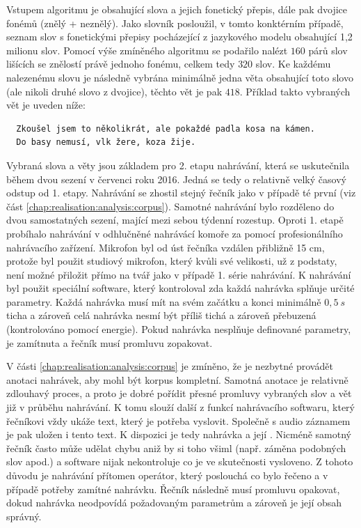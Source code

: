Vstupem algoritmu je  obsahující slova a jejich fonetický přepis, dále pak dvojice fonémů (znělý + neznělý). Jako slovník posloužil, v tomto konktérním případě, seznam slov s fonetickými přepisy pocházející z jazykového modelu obsahující 1,2 milionu slov. Pomocí výše zmíněného algoritmu se podařilo nalézt $160$ párů slov lišících se znělostí právě jednoho fonému, celkem tedy $320$ slov. Ke každému nalezenému slovu je následně vybrána minimálně jedna věta obsahující toto slovo (ale nikoli druhé slovo z dvojice), těchto vět je pak $418$. Příklad takto vybraných vět je uveden níže:

\begin{verbatim}
  Zkoušel jsem to několikrát, ale pokaždé padla kosa na kámen.
  Do basy nemusí, vlk žere, koza žije.
\end{verbatim}

Vybraná slova a věty jsou základem pro 2. etapu nahrávání, která se uskutečnila během dvou sezení v červenci roku 2016. Jedná se tedy o relativně velký časový odstup od 1. etapy. Nahrávání se zhostil stejný řečník jako v případě té první (viz část \ref{chap:realisation:analysis:corpus}). Samotné nahrávání bylo rozděleno do dvou samostatných sezení, mající mezi sebou týdenní rozestup. Oproti 1. etapě probíhalo nahrávání v odhlučněné nahrávácí komoře za pomocí profesionálního nahrávacího zařízení. Mikrofon byl od úst řečníka vzdálen přibližně 15 cm, protože byl použit studiový mikrofon, který kvůli své velikosti, už z podstaty, není možné přiložit přímo na tvář jako v případě 1. série nahrávání. K nahrávání byl použit speciální software, který kontroloval zda každá nahrávka splňuje určité parametry. Každá nahrávka musí mít na svém začátku a konci minimálně $0,5\ s$ ticha a zároveň celá nahrávka nesmí být příliš tichá a zároveň přebuzená (kontrolováno pomocí energie). Pokud nahrávka nesplňuje definované parametry, je zamítnuta a řečník musí promluvu zopakovat.

V části \ref{chap:realisation:analysis:corpus} je zmíněno, že je nezbytné provádět anotaci nahrávek, aby mohl být korpus kompletní. Samotná anotace je  relativně zdlouhavý proces, a proto je dobré pořídit přesné promluvy vybraných slov a vět již v průběhu nahrávání. K tomu slouží další z funkcí nahrávacího softwaru, který řečníkovi vždy ukáže text, který je potřeba vyslovit. Společně s audio záznamem je pak uložen i tento text. K dispozici je tedy nahrávka a její . Nicméně samotný řečník často může udělat chybu aniž by si toho všiml (např. záměna podobných slov apod.) a software nijak nekontroluje co je ve skutečnosti vysloveno. Z tohoto důvodu je nahrávání přítomen operátor, který poslouchá co bylo řečeno a v případě potřeby zamítné nahrávku. Řečník následně musí promluvu opakovat, dokud nahrávka neodpovídá požadovaným parametrům a zároveň je její obsah správný.

